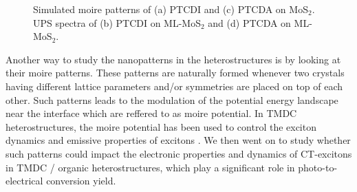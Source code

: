 \documentclass[12pt]{article}
\begin{document}
\begin{figure}[H]
\caption{Simulated moire patterns of (a) PTCDI and (c) PTCDA on MoS$_2$. UPS spectra of (b) PTCDI on ML-MoS$_2$ and (d) PTCDA on ML-MoS$_2$.}\label{fig:Moire}
\end{figure}
Another way to study the nanopatterns in the heterostructures is by looking at their moire patterns. These patterns are naturally formed whenever two crystals having different lattice parameters and/or symmetries are placed on top of each other. Such patterns leads to the modulation of the potential energy landscape near the interface which are reffered to as moire potential. In TMDC heterostructures, the moire potential has been used to control the exciton dynamics and emissive properties of excitons \cite{yuan2020twist,bai2020excitons,seyler2019signatures}. We then went on to study whether such patterns could impact the electronic properties and dynamics of CT-excitons in TMDC / organic heterostructures, which play a significant role in photo-to-electrical conversion yield.

\vspace{7pt}
\end{document}
